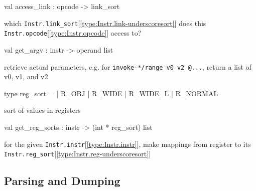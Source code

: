 \documentclass[11pt]{article}
\begin{document}
\label{val:Instr.access-underscorelink}\begin{ocamldoccode}
val access_link : opcode -> link_sort
\end{ocamldoccode}
\begin{ocamldocdescription}
which {\tt{Instr.link\_sort}}[\ref{type:Instr.link-underscoresort}] does this {\tt{Instr.opcode}}[\ref{type:Instr.opcode}] access to?


\end{ocamldocdescription}




\label{val:Instr.get-underscoreargv}\begin{ocamldoccode}
val get_argv : instr -> operand list
\end{ocamldoccode}
\begin{ocamldocdescription}
retrieve actual parameters,
 e.g. for {\tt{invoke-*/range v0 v2 @...}}, return a list of v0, v1, and v2


\end{ocamldocdescription}




\label{type:Instr.reg-underscoresort}\begin{ocamldoccode}
type reg_sort =
  | R_OBJ
  | R_WIDE
  | R_WIDE_L
  | R_NORMAL
\end{ocamldoccode}
\begin{ocamldocdescription}
sort of values in registers


\end{ocamldocdescription}




\label{val:Instr.get-underscorereg-underscoresorts}\begin{ocamldoccode}
val get_reg_sorts : instr -> (int * reg_sort) list
\end{ocamldoccode}
\begin{ocamldocdescription}
for the given {\tt{Instr.instr}}[\ref{type:Instr.instr}], make mappings from register to its {\tt{Instr.reg\_sort}}[\ref{type:Instr.reg-underscoresort}]


\end{ocamldocdescription}




\subsection{Parsing and Dumping}
\end{document}
